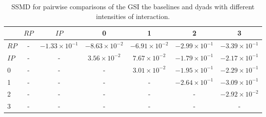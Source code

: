 \begin{table}
\centering
\caption{SSMD for pairwise comparisons of the GSI the baselines and dyads with different intensities of interaction.}
\label{tab:ssmd_gsi}
\begin{tabular}{lcccccc}
\toprule
 & $RP$ & $IP$ & 0 & 1 & 2 & 3 \\
\midrule
$RP$ & - & $-1.33 \times 10^{-1}$ & $-8.63 \times 10^{-2}$ & $-6.91 \times 10^{-2}$ & $-2.99 \times 10^{-1}$ & $-3.39 \times 10^{-1}$ \\
$IP$ & - & - & $3.56 \times 10^{-2}$ & $7.67 \times 10^{-2}$ & $-1.79 \times 10^{-1}$ & $-2.17 \times 10^{-1}$ \\
0 & - & - & - & $3.01 \times 10^{-2}$ & $-1.95 \times 10^{-1}$ & $-2.29 \times 10^{-1}$ \\
1 & - & - & - & - & $-2.64 \times 10^{-1}$ & $-3.09 \times 10^{-1}$ \\
2 & - & - & - & - & - & $-2.92 \times 10^{-2}$ \\
3 & - & - & - & - & - & - \\
\bottomrule
\end{tabular}
\end{table}
